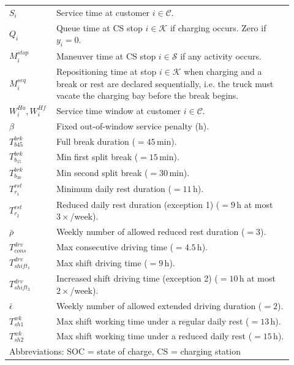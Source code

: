 \documentclass[preprint,12pt,3p]{elsarticle}
\begin{document}
\begin{table}[h!]
\begin{tabular}{p{0.12\linewidth}p{0.8\linewidth}}
$S_i$ & Service time at customer $i \in \mathcal{C}$. \\
$Q_i$ & Queue time at CS stop $i \in \mathcal{K}$ if charging occurs. Zero if $y_i = 0$.\\
$M_i^{stop}$ & Maneuver time at CS stop $i \in \mathcal{S}$ if any activity occurs.\\
$M_i^{seq}$ & Repositioning time at stop $i \in \mathcal{K}$ when charging and a break or rest are declared sequentially, i.e. the truck must vacate the charging bay before the break begins.\\

$W_i^{Ha}, W_i^{Hf}$  & Service time window at customer $i \in \mathcal{C}$. \\
$ \beta$ & Fixed out-of-window service penalty (h). \\

$T^{brk}_{b45}$   & Full break duration ($= 45$\,min). \\
$T^{brk}_{b_{15}}$     & Min first split break ($= 15$\,min). \\
$T^{brk}_{b_{30}}$     & Min second split break ($= 30$\,min). \\
$T^{rst}_{r_1}$          & Minimum daily rest duration ($= 11$\,h). \\
$T^{rst}_{r_2}$          & Reduced daily rest duration (exception 1) ($= 9$\,h at most $3\times$/week). \\
$\bar{\rho}$ & Weekly number of allowed reduced rest duration ($=3$).\\

$T^{drv}_{cons}$   & Max consecutive driving time ($= 4.5$\,h). \\
$T^{drv}_{shift_1}$     & Max shift driving time ($= 9$\,h). \\
$T^{drv}_{shift_2}$     & Increased shift driving time (exception 2) ($= 10$\,h at most $2\times$/week). \\
$\bar \epsilon $ &  Weekly number of allowed extended driving duration ($=2$).\\

$T^{wk}_{sh1}$      & Max shift working time under a regular daily rest ($= 13$\,h). \\
$T^{wk}_{sh2}$      & Max shift working time under a reduced daily rest ($= 15$\,h). \\

\bottomrule
\multicolumn{2}{l}{{\footnotesize Abbreviations: SOC = state of charge, CS = charging station}}\\
\end{tabular}
\end{table}
\end{document}
